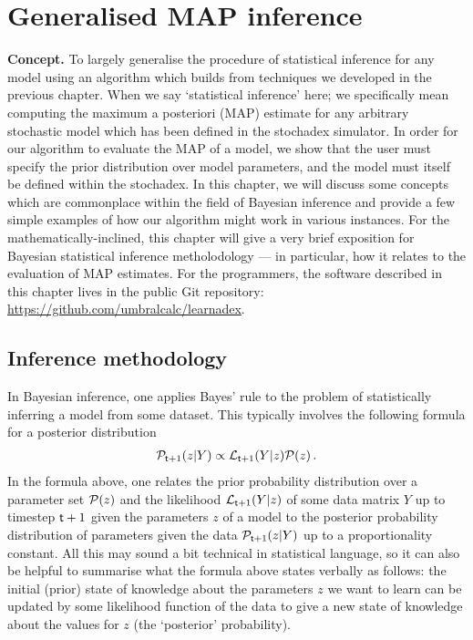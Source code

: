 \chapter{\sffamily Generalised MAP inference}

{\bfseries\sffamily Concept.} To largely generalise the procedure of statistical inference for any model using an algorithm which builds from techniques we developed in the previous chapter. When we say `statistical inference' here; we specifically mean computing the maximum a posteriori (MAP) estimate for any arbitrary stochastic model which has been defined in the stochadex simulator. In order for our algorithm to evaluate the MAP of a model, we show that the user must specify the prior distribution over model parameters, and the model must itself be defined within the stochadex. In this chapter, we will discuss some concepts which are commonplace within the field of Bayesian inference and provide a few simple examples of how our algorithm might work in various instances. For the mathematically-inclined, this chapter will give a very brief exposition for Bayesian statistical inference metholodology --- in particular, how it relates to the evaluation of MAP estimates. For the programmers, the software described in this chapter lives in the public Git repository: \href{https://github.com/umbralcalc/learnadex}{https://github.com/umbralcalc/learnadex}.


\section{\sffamily Inference methodology}

In Bayesian inference, one applies Bayes' rule to the problem of statistically inferring a model from some dataset. This typically involves the following formula for a posterior distribution
\begin{align}
{\cal P}_{{\sf t}+1}(z \vert Y) \propto {\cal L}_{{\sf t}+1}(Y\vert z){\cal P} (z) \label{eq:bayes-rule} \,.
\end{align}
In the formula above, one relates the prior probability distribution over a parameter set ${\cal P} (z)$ and the likelihood ${\cal L}_{{\sf t}+1}(Y\vert z)$  of some data matrix $Y$ up to timestep ${\sf t}+1$ given the parameters $z$ of a model to the posterior probability distribution of parameters given the data ${\cal P}_{{\sf t}+1}(z \vert Y)$ up to a proportionality constant. All this may sound a bit technical in statistical language, so it can also be helpful to summarise what the formula above states verbally as follows: the initial (prior) state of knowledge about the parameters $z$ we want to learn can be updated by some likelihood function of the data to give a new state of knowledge about the values for $z$ (the `posterior' probability). 

